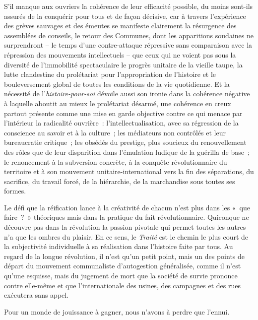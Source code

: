 \documentclass[french,twoside]{book} %
\newcommand{\dateline}[1]{\medskip{\RaggedLeft{#1}\par}\bigskip}
\begin{document}
S’il manque aux ouvriers la cohérence de leur efficacité possible, du moins sont-ils assurés de la conquérir pour tous et de façon décisive, car à travers l’expérience des grèves sauvages et des émeutes se manifeste clairement la résurgence des assemblées de conseils, le retour des Communes, dont les apparitions soudaines ne surprendront – le temps d’une contre-attaque répressive sans comparaison avec la répression des mouvements intellectuels – que ceux qui ne voient pas sous la diversité de l’immobilité spectaculaire le progrès unitaire de la vieille taupe, la lutte clandestine du prolétariat pour l’appropriation de l’histoire et le bouleversement global de toutes les conditions de la vie quotidienne. Et la nécessité de l’\emph{histoire-pour-soi} dévoile aussi son ironie dans la cohérence négative à laquelle aboutit au mieux le prolétariat désarmé, une cohérence en creux partout présente comme une mise en garde objective contre ce qui menace par l’intérieur la radicalité ouvrière : l’intellectualisation, avec sa régression de la conscience au savoir et à la culture ; les médiateurs non contrôlés et leur bureaucratie critique ; les obsédés du prestige, plus soucieux du renouvellement des rôles que de leur disparition dans l’émulation ludique de la guérilla de base ; le renoncement à la subversion concrète, à la conquête révolutionnaire du territoire et à son mouvement unitaire-international vers la fin des séparations, du sacrifice, du travail forcé, de la hiérarchie, de la marchandise sous toutes ses formes.\par
Le défi que la réification lance à la créativité de chacun n’est plus dans les « que faire ? » théoriques mais dans la pratique du fait révolutionnaire. Quiconque ne découvre pas dans la révolution la passion pivotale qui permet toutes les autres n’a que les ombres du plaisir. En ce sens, le \emph{Traité} est le chemin le plus court de la subjectivité individuelle à sa réalisation dans l’histoire faite par tous. Au regard de la longue révolution, il n’est qu’un petit point, mais un des points de départ du mouvement communaliste d’autogestion généralisée, comme il n’est qu’une esquisse, mais du jugement de mort que la société de survie prononce contre elle-même et que l’internationale des usines, des campagnes et des rues exécutera sans appel.\par
Pour un monde de jouissance à gagner, nous n’avons à perdre que l’ennui.\par

\dateline{Octobre 1972.}
 
\end{document}
